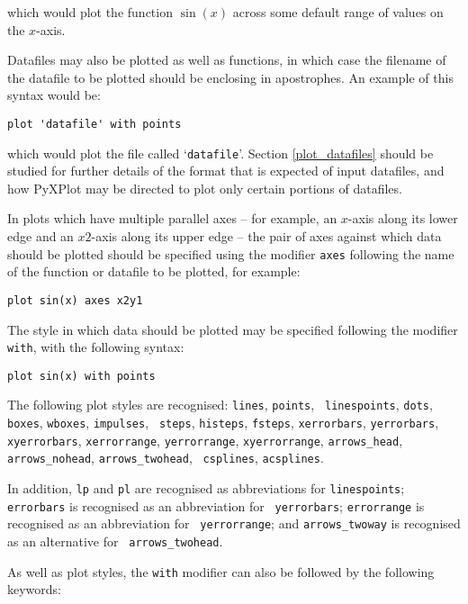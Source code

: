 \documentclass[a4paper,onecolumn,11pt]{book}
\begin{document}
\noindent which would plot the function $\sin(x)$ across some default range of
values on the $x$-axis.

Datafiles may also be plotted as well as functions, in which case the filename
of the datafile to be plotted should be enclosing in apostrophes. An example of
this syntax would be:

\begin{verbatim}
plot 'datafile' with points
\end{verbatim}

\noindent which would plot the file called `{\tt datafile}'.  Section
\ref{plot_datafiles} should be studied for further details of the format that is
expected of input datafiles, and how PyXPlot may be directed to plot only
certain portions of datafiles.

In plots which have multiple parallel axes -- for example, an $x$-axis along its
lower edge and an $x2$-axis along its upper edge -- the pair of axes against
which data should be plotted should be specified using the modifier {\tt axes}
following the name of the function or datafile to be plotted, for example:

\begin{verbatim}
plot sin(x) axes x2y1
\end{verbatim}

The style in which data should be plotted may be specified following the
modifier {\tt with}, with the following syntax:

\begin{verbatim}
plot sin(x) with points
\end{verbatim}

The following plot styles are recognised: {\tt lines}, {\tt points}, {\tt
linespoints}, {\tt dots}, {\tt boxes}, {\tt wboxes}, {\tt impulses}, {\tt
steps}, {\tt histeps}, {\tt fsteps}, {\tt xerrorbars}, {\tt yerrorbars}, {\tt
xyerrorbars}, {\tt xerrorrange}, {\tt yerrorrange}, {\tt xyerrorrange},
\newline\noindent %
{\tt arrows\_head}, {\tt arrows\_nohead}, {\tt arrows\_twohead}, {\tt
csplines}, {\tt acsplines}.

In addition, {\tt lp} and {\tt pl} are recognised as abbreviations
for {\tt linespoints}; {\tt errorbars} is recognised as an abbreviation for {\tt
yerrorbars}; {\tt errorrange} is recognised as an abbreviation for {\tt
yerrorrange}; and {\tt arrows\_twoway} is recognised as an alternative for {\tt
arrows\_twohead}.

As well as plot styles, the {\tt with} modifier can also be followed by the
following keywords:
\end{document}
